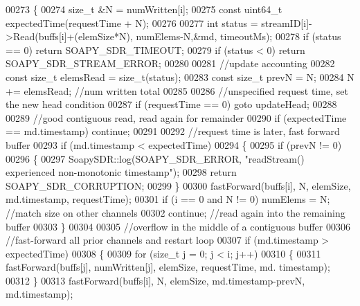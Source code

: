 \begin{DoxyCode}
00273     \{
00274         \textcolor{keywordtype}{size\_t} &N = numWritten[i];
00275         \textcolor{keyword}{const} uint64\_t expectedTime(requestTime + N);
00276 
00277         \textcolor{keywordtype}{int} status = streamID[i]->Read(buffs[i]+(elemSize*N), numElems-N,&md, timeoutMs);
00278         \textcolor{keywordflow}{if} (status == 0) \textcolor{keywordflow}{return} SOAPY\_SDR\_TIMEOUT;
00279         \textcolor{keywordflow}{if} (status < 0) \textcolor{keywordflow}{return} SOAPY\_SDR\_STREAM\_ERROR;
00280 
00281         \textcolor{comment}{//update accounting}
00282         \textcolor{keyword}{const} \textcolor{keywordtype}{size\_t} elemsRead = size\_t(status);
00283         \textcolor{keyword}{const} \textcolor{keywordtype}{size\_t} prevN = N;
00284         N += elemsRead; \textcolor{comment}{//num written total}
00285 
00286         \textcolor{comment}{//unspecified request time, set the new head condition}
00287         \textcolor{keywordflow}{if} (requestTime == 0) \textcolor{keywordflow}{goto} updateHead;
00288 
00289         \textcolor{comment}{//good contiguous read, read again for remainder}
00290         \textcolor{keywordflow}{if} (expectedTime == md.timestamp) \textcolor{keywordflow}{continue};
00291 
00292         \textcolor{comment}{//request time is later, fast forward buffer}
00293         \textcolor{keywordflow}{if} (md.timestamp < expectedTime)
00294         \{
00295             \textcolor{keywordflow}{if} (prevN != 0)
00296             \{
00297                 SoapySDR::log(SOAPY\_SDR\_ERROR, \textcolor{stringliteral}{"readStream() experienced non-monotonic timestamp"});
00298                 \textcolor{keywordflow}{return} SOAPY\_SDR\_CORRUPTION;
00299             \}
00300             fastForward(buffs[i], N, elemSize, md.timestamp, requestTime);
00301             \textcolor{keywordflow}{if} (i == 0 and N != 0) numElems = N; \textcolor{comment}{//match size on other channels}
00302             \textcolor{keywordflow}{continue}; \textcolor{comment}{//read again into the remaining buffer}
00303         \}
00304 
00305         \textcolor{comment}{//overflow in the middle of a contiguous buffer}
00306         \textcolor{comment}{//fast-forward all prior channels and restart loop}
00307         \textcolor{keywordflow}{if} (md.timestamp > expectedTime)
00308         \{
00309             \textcolor{keywordflow}{for} (\textcolor{keywordtype}{size\_t} j = 0; j < i; j++)
00310             \{
00311                 fastForward(buffs[j], numWritten[j], elemSize, requestTime, md.
      timestamp);
00312             \}
00313             fastForward(buffs[i], N, elemSize, md.timestamp-prevN, md.timestamp);

\end{DoxyCode}
